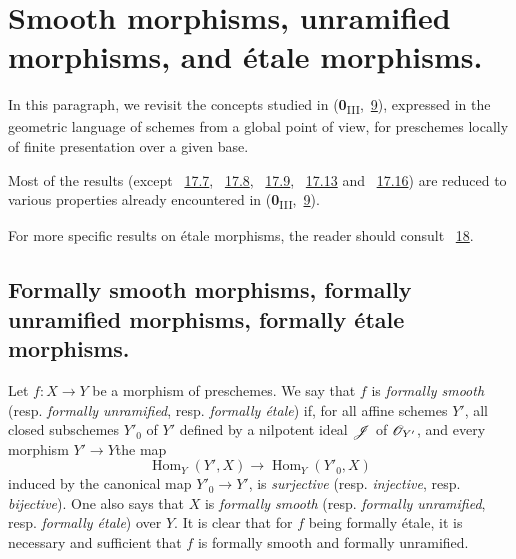 \section{Smooth morphisms, unramified morphisms, and \'etale morphisms.}
\label{section:IV.17}

In this paragraph, we revisit the concepts studied in (\textbf{0}\textsubscript{III},~\hyperref[section:0.9]{9}), expressed in the geometric language of schemes from a global point of view, for preschemes locally of finite presentation over a given base.

Most of the results (except ~\hyperref[subsection:IV.17.7]{17.7}, ~\hyperref[subsection:IV.17.8]{17.8}, ~\hyperref[subsection:IV.17.9]{17.9}, ~\hyperref[subsection:IV.17.13]{17.13} and ~\hyperref[subsection:IV.17.16]{17.16}) are reduced to various properties already encountered in (\textbf{0}\textsubscript{III},~\hyperref[section:0.9]{9}).

For more specific results on \'etale morphisms, the reader should consult ~\textsection\hyperref[section:IV.18]{18}. 

\subsection{Formally smooth morphisms, formally unramified morphisms, formally \'etale morphisms.}
\label{subsection:IV.17.1}

\begin{definition}[17.1.1]
\label{IV.17.1.1}
Let $f:X\to Y$ be a morphism of preschemes. We say that $f$ is \emph{formally smooth} (resp. \emph{formally unramified}, resp. \emph{formally \'etale}) if, for all affine schemes $Y'$, all closed subschemes $Y'_{0}$ of $Y'$ defined by a nilpotent ideal $\mathscr{J}$ of $\mathscr{O}_{Y'}$, and every morphism $Y'\to Y$the map 
\[
\label{IV.17.1.1.1}
\operatorname{Hom}_{Y}(Y', X) \to \operatorname{Hom}_{Y}(Y'_{0}, X)
\tag{17.1.1.1}
\] induced by the canonical map $Y'_{0}\to Y'$, is \emph{surjective} (resp. \emph{injective}, resp. \emph{bijective}).
One also says that $X$ is \emph{formally smooth} (resp. \emph{formally unramified}, resp. \emph{formally \'etale}) over $Y$.
It is clear that for $f$ being formally \'etale, it is necessary and sufficient that $f$ is formally smooth and formally unramified.
\end{definition}

